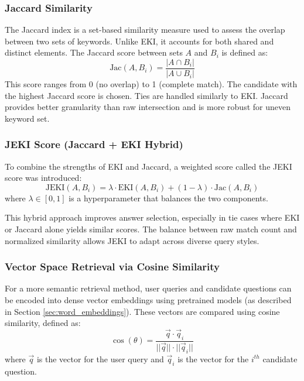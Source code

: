 \documentclass[conference]{IEEEtran}
\begin{document}
\subsubsection{Jaccard Similarity}
The Jaccard index is a set-based similarity measure used to assess the overlap between two sets of keywords. 
Unlike EKI, it accounts for both shared and distinct elements.
The Jaccard score between sets $A$ and $B_i$ is defined as:
\begin{equation}
    \text{Jac}(A, B_i) = \frac{|A \cap B_i|}{|A \cup B_i|}
\end{equation}
This score ranges from 0 (no overlap) to 1 (complete match). 
The candidate with the highest Jaccard score is chosen. 
Ties are handled similarly to EKI. 
Jaccard provides better granularity than raw intersection and is more robust for uneven keyword set.

\subsubsection{JEKI Score (Jaccard + EKI Hybrid)}
To combine the strengths of EKI and Jaccard, a weighted score called the JEKI score was introduced:
\begin{equation}
    \text{JEKI}(A, B_i) = \lambda \cdot \text{EKI}(A, B_i) + (1 - \lambda) \cdot \text{Jac}(A, B_i)
\end{equation}
where $\lambda \in [0, 1]$ is a hyperparameter that balances the two components.

This hybrid approach improves answer selection, especially in tie cases where EKI or Jaccard alone yields similar scores. 
The balance between raw match count and normalized similarity allows JEKI to adapt across diverse query styles.

\subsubsection{Vector Space Retrieval via Cosine Similarity}
For a more semantic retrieval method, user queries and candidate questions can be encoded into dense vector embeddings using pretrained models (as described in Section \ref{sec:word_embeddings}). 
These vectors are compared using cosine similarity, defined as:
\begin{equation}
    \cos(\theta) = \frac{ \vec{q} \cdot \vec{q}_i }{ ||\vec{q}|| \cdot ||\vec{q}_i|| }
\end{equation}
where $\vec{q}$ is the vector for the user query and $\vec{q}_i$ is the vector for the $i^{th}$ candidate question.
\end{document}
